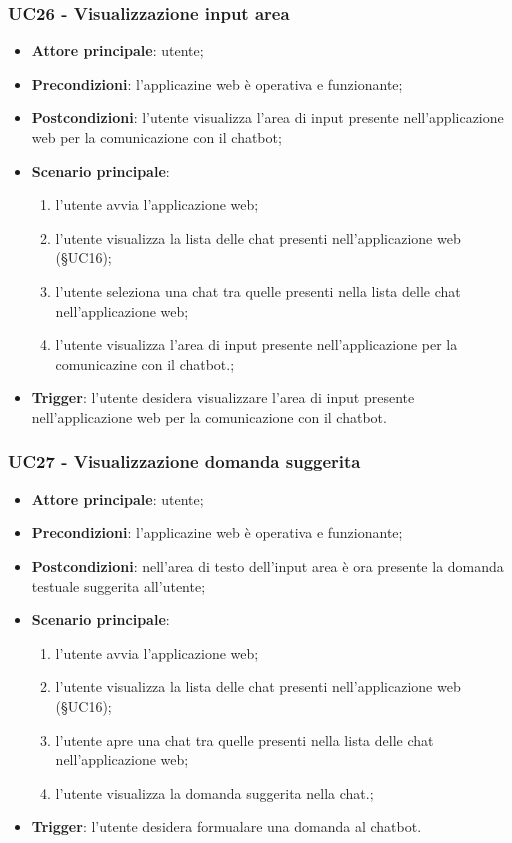 \documentclass[10pt, a4paper]{article}
\begin{document}
    \subsubsection{UC26 - Visualizzazione input area}
    \begin{itemize}
        \item \textbf{Attore principale}: utente;
        \item \textbf{Precondizioni}: l'applicazine web è operativa e funzionante;
        \item \textbf{Postcondizioni}: l'utente visualizza l'area di input presente nell'applicazione web per la comunicazione con il chatbot;
        \item \textbf{Scenario principale}:
            \begin{enumerate}
                \item l'utente avvia l'applicazione web;
                \item l'utente visualizza la lista delle chat presenti nell'applicazione web (\S UC16);
                \item l'utente seleziona una chat tra quelle presenti nella lista delle chat nell'applicazione web;
                \item l'utente visualizza l'area di input presente nell'applicazione per la comunicazine con il chatbot.;
            \end{enumerate}
        \item \textbf{Trigger}: l'utente desidera visualizzare l'area di input presente nell'applicazione web per la comunicazione con il chatbot.
    \end{itemize}

    \subsubsection{UC27 - Visualizzazione domanda suggerita}
    \begin{itemize}
        \item \textbf{Attore principale}: utente;
        \item \textbf{Precondizioni}: l'applicazine web è operativa e funzionante;
        \item \textbf{Postcondizioni}: nell'area di testo dell'input area è ora presente la domanda testuale suggerita all'utente;
        \item \textbf{Scenario principale}:
            \begin{enumerate}
                \item l'utente avvia l'applicazione web;
                \item l'utente visualizza la lista delle chat presenti nell'applicazione web (\S UC16);
                \item l'utente apre una chat tra quelle presenti nella lista delle chat nell'applicazione web;
                \item l'utente visualizza la domanda suggerita nella chat.;
            \end{enumerate}
        \item \textbf{Trigger}: l'utente desidera formualare una domanda al chatbot.
    \end{itemize}
\end{document}
